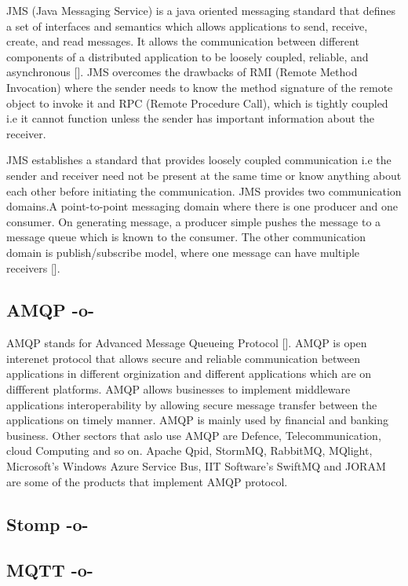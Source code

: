 JMS (Java Messaging Service) is a java oriented messaging standard
that defines a set of interfaces and semantics which allows
applications to send, receive, create, and read messages.  It allows
the communication between different components of a distributed
application to be loosely coupled, reliable, and asynchronous
[\cite{www-jms-wiki}]. JMS overcomes the drawbacks of RMI (Remote
Method Invocation) where the sender needs to know the method signature
of the remote object to invoke it and RPC (Remote Procedure Call),
which is tightly coupled i.e it cannot function unless the sender has
important information about the receiver.

JMS establishes a standard that provides loosely coupled communication
i.e the sender and receiver need not be present at the same time or
know anything about each other before initiating the communication.
JMS provides two communication domains.A point-to-point messaging
domain where there is one producer and one consumer. On generating
message, a producer simple pushes the message to a message queue which
is known to the consumer. The other communication domain is
publish/subscribe model, where one message can have multiple
receivers [\cite{www-jms-oracle-docs}].

\subsection{AMQP -o-}

AMQP stands for Advanced Message Queueing
Protocol [\cite{www-amqp}]. AMQP is open interenet protocol that allows
secure and reliable communication between applications in different
orginization and different applications which are on diffferent
platforms. AMQP allows businesses to implement middleware applications
interoperability by allowing secure message transfer between the
applications on timely manner. AMQP is mainly used by financial and
banking business. Other sectors that aslo use AMQP are Defence,
Telecommunication, cloud Computing and so on.  Apache Qpid, StormMQ,
RabbitMQ, MQlight, Microsoft's Windows Azure Service Bus, IIT
Software's SwiftMQ and JORAM are some of the products that implement
AMQP protocol.



\subsection{Stomp -o-}



\subsection{MQTT -o-}
     
